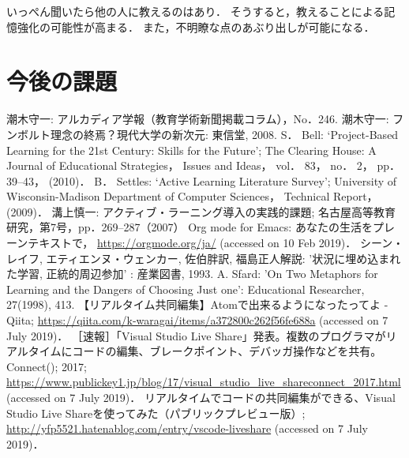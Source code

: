 \documentclass{hissymp}
\begin{document}
いっぺん聞いたら他の人に教えるのはあり．
そうすると，教えることによる記憶強化の可能性が高まる．
また，不明瞭な点のあぶり出しが可能になる．

\section{今後の課題}
\label{sec:org0579167}

\begin{thebibliography}{7}
 潮木守一: アルカディア学報（教育学術新聞掲載コラム），No．246.
 潮木守一: フンボルト理念の終焉？現代大学の新次元: 東信堂, 2008.
 S． Bell: ‘Project-Based Learning for the 21st Century: Skills for the Future’; The Clearing House: A Journal of Educational Strategies， Issues and Ideas， vol． 83， no． 2， pp． 39–43， (2010)．
 B． Settles: ‘Active Learning Literature Survey’; University of Wisconsin-Madison Department of Computer Sciences， Technical Report， (2009)．
 溝上慎一: アクティブ・ラーニング導入の実践的課題; 名古屋高等教育研究，第7号，pp．269--287（2007）
 Org mode for Emacs: あなたの生活をプレーンテキストで， \url{https://orgmode.org/ja/} (accessed on 10 Feb 2019)．
 シーン・レイフ, エティエンヌ・ウェンカー, 佐伯胖訳, 福島正人解説: '状況に埋め込まれた学習, 正統的周辺参加' : 産業図書, 1993.
 A. Sfard: 'On Two Metaphors for Learning and the Dangers of Choosing Just one': Educational Researcher, 27(1998), 413.
 【リアルタイム共同編集】Atomで出来るようになったってよ - Qiita; \url{https://qiita.com/k-waragai/items/a372800c262f56fe688a} (accessed on 7 July 2019)．
  ［速報］「Visual Studio Live Share」発表。複数のプログラマがリアルタイムにコードの編集、ブレークポイント、デバッガ操作などを共有。Connect(); 2017; \url{https://www.publickey1.jp/blog/17/visual_studio_live_shareconnect_2017.html} (accessed on 7 July 2019)．
 リアルタイムでコードの共同編集ができる、Visual Studio Live Shareを使ってみた（パブリックプレビュー版）; \url{http://yfp5521.hatenablog.com/entry/vscode-liveshare} (accessed on 7 July 2019)．
\end{thebibliography}
\end{document}
